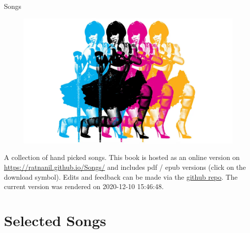 \documentclass[
]{book}
\author{}
\date{\vspace{-2.5em}}
\begin{document}

\begin{titlepage}
\begin{center}
  

\end{center}
\vspace{1.5cm}
\begin{center}

{\LARGE Songs}

\end{center}
 \vspace{1cm}

\begin{figure}[htbp]
  \centering
  \includegraphics[width=1\textwidth]{misc/title.png}
  \label{titelbild}
\end{figure}

\begin{center}
\textbf{}


\end{center} 

\vspace{1.0cm}


\end{titlepage}

{
\setcounter{tocdepth}{1}
\tableofcontents
}
A collection of hand picked songs. This book is hosted as an online version on \url{https://ratnanil.github.io/Songs/} and includes pdf / epub versions (click on the download symbol). Edits and feedback can be made via the \href{https://github.com/ratnanil/songs}{github repo}. The current version was rendered on 2020-12-10 15:46:48.

\hypertarget{selected-songs}{%
\chapter{Selected Songs}\label{selected-songs}}
\end{document}
